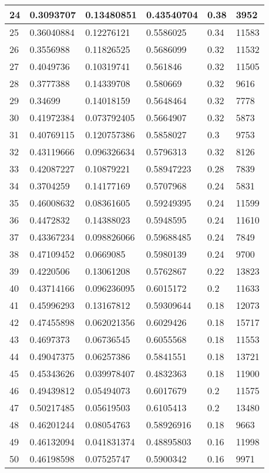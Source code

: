 \begin{longtable}{|l|l|l|l|l|l|}
24 & 0.3093707 & 0.13480851 & 0.43540704 & 0.38 & 3952 \\ \hline 
25 & 0.36040884 & 0.12276121 & 0.5586025 & 0.34 & 11583 \\ \hline 
26 & 0.3556988 & 0.11826525 & 0.5686099 & 0.32 & 11532 \\ \hline 
27 & 0.4049736 & 0.10319741 & 0.561846 & 0.32 & 11505 \\ \hline 
28 & 0.3777388 & 0.14339708 & 0.580669 & 0.32 & 9616 \\ \hline 
29 & 0.34699 & 0.14018159 & 0.5648464 & 0.32 & 7778 \\ \hline 
30 & 0.41972384 & 0.073792405 & 0.5664907 & 0.32 & 5873 \\ \hline 
31 & 0.40769115 & 0.120757386 & 0.5858027 & 0.3 & 9753 \\ \hline 
32 & 0.43119666 & 0.096326634 & 0.5796313 & 0.32 & 8126 \\ \hline 
33 & 0.42087227 & 0.10879221 & 0.58947223 & 0.28 & 7839 \\ \hline 
34 & 0.3704259 & 0.14177169 & 0.5707968 & 0.24 & 5831 \\ \hline 
35 & 0.46008632 & 0.08361605 & 0.59249395 & 0.24 & 11599 \\ \hline 
36 & 0.4472832 & 0.14388023 & 0.5948595 & 0.24 & 11610 \\ \hline 
37 & 0.43367234 & 0.098826066 & 0.59688485 & 0.24 & 7849 \\ \hline 
38 & 0.47109452 & 0.0669085 & 0.5980139 & 0.24 & 9700 \\ \hline 
39 & 0.4220506 & 0.13061208 & 0.5762867 & 0.22 & 13823 \\ \hline 
40 & 0.43714166 & 0.096236095 & 0.6015172 & 0.2 & 11633 \\ \hline 
41 & 0.45996293 & 0.13167812 & 0.59309644 & 0.18 & 12073 \\ \hline 
42 & 0.47455898 & 0.062021356 & 0.6029426 & 0.18 & 15717 \\ \hline 
43 & 0.4697373 & 0.06736545 & 0.6055568 & 0.18 & 11553 \\ \hline 
44 & 0.49047375 & 0.06257386 & 0.5841551 & 0.18 & 13721 \\ \hline 
45 & 0.45343626 & 0.039978407 & 0.4832363 & 0.18 & 11900 \\ \hline 
46 & 0.49439812 & 0.05494073 & 0.6017679 & 0.2 & 11575 \\ \hline 
47 & 0.50217485 & 0.05619503 & 0.6105413 & 0.2 & 13480 \\ \hline 
48 & 0.46201244 & 0.08054763 & 0.58926916 & 0.18 & 9663 \\ \hline 
49 & 0.46132094 & 0.041831374 & 0.48895803 & 0.16 & 11998 \\ \hline 
50 & 0.46198598 & 0.07525747 & 0.5900342 & 0.16 & 9971 \\ \hline 
\end{longtable}